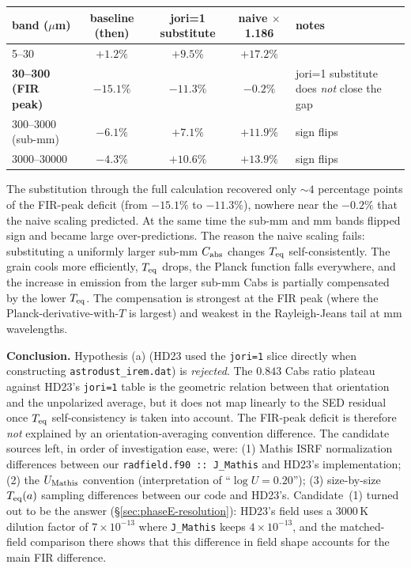 \documentclass{my_memo}
\let\mathbf\boldsymbol
\begin{document}
\begin{tabularx}{0.95\textwidth}{l c c c X}
\toprule
band ($\mu$m)            & baseline (then) & jori=1 substitute & naive $\times$1.186 & notes \\
\midrule
5--30                    & $+1.2\%$    & $+9.5\%$   & $+17.2\%$    & \\
\bfseries 30--300 (FIR peak)  & $\mathbf{-15.1\%}$ & $\mathbf{-11.3\%}$ & $\mathbf{-0.2\%}$ & jori=1 substitute does \emph{not} close the gap \\
300--3000 (sub-mm)       & $-6.1\%$    & $+7.1\%$   & $+11.9\%$    & sign flips \\
3000--30000              & $-4.3\%$    & $+10.6\%$  & $+13.9\%$    & sign flips \\
\bottomrule
\end{tabularx}

The substitution through the full calculation recovered only $\sim 4$
percentage points of the FIR-peak deficit (from $-15.1\%$ to
$-11.3\%$), nowhere near the $-0.2\%$ that the naive scaling
predicted. At the same time the sub-mm and mm bands flipped sign and
became large over-predictions. The reason the naive scaling fails:
substituting a uniformly larger sub-mm $C_{\rm abs}$ changes
$T_{\rm eq}$ self-consistently. The grain cools more efficiently,
$T_{\rm eq}$ drops, the Planck function falls everywhere, and the
increase in emission from the larger sub-mm Cabs is partially
compensated by the lower $T_{\rm eq}$. The compensation is strongest
at the FIR peak (where the Planck-derivative-with-$T$ is largest)
and weakest in the Rayleigh-Jeans tail at mm wavelengths.

\textbf{Conclusion.} Hypothesis (a) (HD23 used the \texttt{jori=1}
slice directly when constructing \texttt{astrodust\_irem.dat}) is
\emph{rejected}. The $0.843$ Cabs ratio plateau against HD23's
\texttt{jori=1} table is the geometric relation between that
orientation and the unpolarized average, but it does not map linearly
to the SED residual once $T_{\rm eq}$ self-consistency is taken into
account. The FIR-peak deficit is therefore \emph{not} explained by an
orientation-averaging convention difference. The candidate sources
left, in order of investigation ease, were: (1) Mathis ISRF
normalization differences between our \texttt{radfield.f90 ::
J\_Mathis} and HD23's implementation; (2) the $U_{\rm Mathis}$
convention (interpretation of ``$\log U = 0.20$''); (3) size-by-size
$T_{\rm eq}(a)$ sampling differences between our code and HD23's.
Candidate~(1) turned out to be the answer
(\S\ref{sec:phaseE-resolution}): HD23's field uses a 3000\,K dilution
factor of $7\times10^{-13}$ where \texttt{J\_Mathis} keeps
$4\times10^{-13}$, and the matched-field comparison there shows that
this difference in field shape accounts for the main FIR difference.
\end{document}
